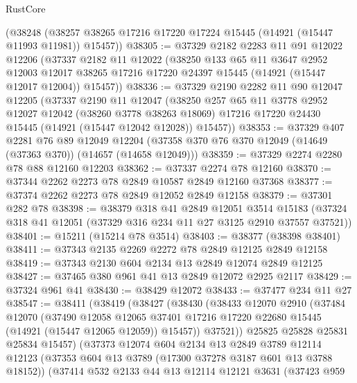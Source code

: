 \begin{lexlean}{RustCore}
\begin{coremodule}
    (@38248 (@38257 @38265 @17216 @17220 @17224 @15445 (@14921 (@15447 @11993 @11981)) @15457))
@38305 := @37329
    @2182
    @2283
    @11
    @91
    @12022
    @12206
    (@37337
      @2182
      @11
      @12022
      (@38250
        @133
        @65
        @11
        @3647
        @2952
        @12003
        @12017
        @38265
        @17216
        @17220
        @24397
        @15445
        (@14921 (@15447 @12017 @12004))
        @15457))
@38336 := @37329
    @2190
    @2282
    @11
    @90
    @12047
    @12205
    (@37337
      @2190
      @11
      @12047
      (@38250
        @257
        @65
        @11
        @3778
        @2952
        @12027
        @12042
        (@38260 @3778 @38263 @18069)
        @17216
        @17220
        @24430
        @15445
        (@14921 (@15447 @12042 @12028))
        @15457))
@38353 := @37329
    @407
    @2281
    @76
    @89
    @12049
    @12204
    (@37358 @370 @76 @370 @12049 (@14649 (@37363 @370)) (@14657 (@14658 @12049)))
@38359 := @37329 @2274 @2280 @78 @88 @12160 @12203
@38362 := @37337 @2274 @78 @12160
@38370 := @37344 @2262 @2273 @78 @2849 @10587 @2849 @12160 @37368
@38377 := @37374 @2262 @2273 @78 @2849 @12052 @2849 @12158
@38379 := @37301 @282 @78
@38398 := @38379
    @318
    @41
    @2849
    @12051
    @3514
    @15183
    (@37324 @318 @41 @12051 (@37329 @316 @234 @11 @27 @3125 @2910 @37557 @37521))
@38401 := @15211 (@15214 @78 @3514)
@38403 := @38377 (@38398 @38401)
@38411 := @37343 @2135 @2269 @2272 @78 @2849 @12125 @2849 @12158
@38419 := @37343 @2130 @604 @2134 @13 @2849 @12074 @2849 @12125
@38427 := @37465 @380 @961 @41 @13 @2849 @12072 @2925 @2117
@38429 := @37324 @961 @41
@38430 := @38429 @12072
@38433 := @37477 @234 @11 @27
@38547 := @38411
    (@38419
      (@38427
        (@38430
          (@38433
            @12070
            @2910
            (@37484
              @12070
              (@37490
                @12058
                @12065
                @37401
                @17216
                @17220
                @22680
                @15445
                (@14921 (@15447 @12065 @12059))
                @15457))
            @37521))
        @25825
        @25828
        @25831
        @25834
        @15457)
      (@37373
        @12074
        @604
        @2134
        @13
        @2849
        @3789
        @12114
        @12123
        (@37353 @604 @13 @3789 (@17300 @37278 @3187 @601 @13 @3788 @18152))
        (@37414
          @532
          @2133
          @44
          @13
          @12114
          @12121
          @3631
          (@37423
            @959

\end{coremodule}
\end{lexlean}
